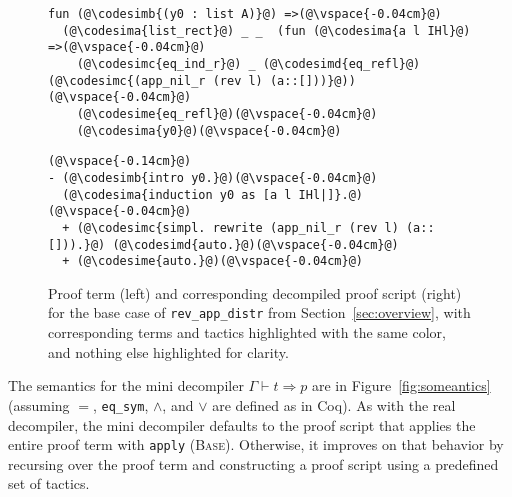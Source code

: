 \begin{figure*}
\begin{minipage}{0.48\textwidth}
\begin{lstlisting}
fun (@\codesimb{(y0 : list A)}@) =>(@\vspace{-0.04cm}@)
  (@\codesima{list_rect}@) _ _  (fun (@\codesima{a l IHl}@) =>(@\vspace{-0.04cm}@)
    (@\codesimc{eq_ind_r}@) _ (@\codesimd{eq_refl}@) (@\codesimc{(app_nil_r (rev l) (a::[]))}@))(@\vspace{-0.04cm}@)
    (@\codesime{eq_refl}@)(@\vspace{-0.04cm}@)
    (@\codesima{y0}@)(@\vspace{-0.04cm}@)
\end{lstlisting}
\end{minipage}
\begin{minipage}{0.48\textwidth}
\begin{lstlisting}
(@\vspace{-0.14cm}@)
- (@\codesimb{intro y0.}@)(@\vspace{-0.04cm}@)
  (@\codesima{induction y0 as [a l IHl|]}.@)(@\vspace{-0.04cm}@)
  + (@\codesimc{simpl. rewrite (app_nil_r (rev l) (a::[])).}@) (@\codesimd{auto.}@)(@\vspace{-0.04cm}@)
  + (@\codesime{auto.}@)(@\vspace{-0.04cm}@)
\end{lstlisting}
\end{minipage}
\vspace{-0.4cm}
\caption{Proof term (left) and corresponding decompiled proof script (right) for the base case of 
\lstinline{rev_app_distr} from Section~\ref{sec:overview}, with corresponding terms and tactics 
highlighted with the same color, and nothing else highlighted for clarity.}
\label{fig:rainbow}
\end{figure*}

The semantics for the mini decompiler $\Gamma \vdash t \Rightarrow p$ are in Figure~\ref{fig:someantics} (assuming $=$, \lstinline{eq_sym}, $\wedge$, and $\vee$ are defined as in Coq).
As with the real decompiler, the mini decompiler defaults to the proof script
that applies the entire proof term with \lstinline{apply} (\textsc{Base}).
Otherwise, it improves on that behavior by recursing over the proof term and constructing a proof script using a predefined set of tactics.

